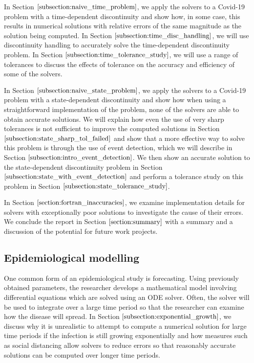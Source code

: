 In Section $\ref{subsection:naive_time_problem}$, we apply the solvers to a Covid-19 problem with a time-dependent discontinuity and show how, in some case, this results in numerical solutions with relative errors of the same magnitude as the solution being computed. In Section $\ref{subsection:time_disc_handling}$, we will use discontinuity handling to accurately solve the time-dependent discontinuity problem. In Section $\ref{subsection:time_tolerance_study}$, we will use a range of tolerances to discuss the effects of tolerance on the accuracy and efficiency of some of the solvers.

In Section $\ref{subsection:naive_state_problem}$, we apply the solvers to a Covid-19 problem with a state-dependent discontinuity and show how when using a straightforward implementation of the problem, none of the solvers are able to obtain accurate solutions. We will explain how even the use of very sharp tolerances is not sufficient to improve the computed solutions in Section $\ref{subsection:state_sharp_tol_failed}$ and show that a more effective way to solve this problem is through the use of event detection, which we will describe in Section $\ref{subsection:intro_event_detection}$. We then show an accurate solution to the state-dependent discontinuity problem in Section $\ref{subsection:state_with_event_detection}$ and perform a tolerance study on this problem in Section $\ref{subsection:state_tolerance_study}$.

In Section $\ref{section:fortran_inaccuracies}$, we examine implementation details for solvers with exceptionally poor solutions to investigate the cause of their errors. We conclude the report in Section $\ref{section:summary}$ with a summary and a discussion of the potential for future work projects.

\subsection{Epidemiological modelling}
\label{subsection:research_papers}
One common form of an epidemiological study is forecasting. Using previously obtained parameters, the researcher develops a mathematical model involving differential equations which are solved using an ODE solver. Often, the solver will be used to integrate over a large time period so that the researcher can examine how the disease will spread. In Section $\ref{subsection:exponential_growth}$, we discuss why it is unrealistic to attempt to compute a numerical solution for large time periods if the infection is still growing exponentially and how measures such as social distancing allow solvers to reduce errors so that reasonably accurate solutions can be computed over longer time periods.

